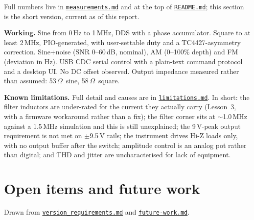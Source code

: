 \documentclass[11pt,a4paper]{article}
\newcommand{\ohm}{\ensuremath{\Omega}}
\newcommand{\doc}[1]{\href{https://github.com/Lambros25/Function-Generator/blob/main/docs/#1}{\texttt{#1}}}
\newcommand{\docu}[2]{\href{https://github.com/Lambros25/Function-Generator/blob/main/docs/#1}{\texttt{#2}}}
\newcommand{\repofile}[1]{\href{https://github.com/Lambros25/Function-Generator/blob/main/#1}{\texttt{#1}}}
\begin{document}
Full numbers live in \doc{measurements.md} and at the top of \repofile{README.md}; this
section is the short version, current as of this report.

\textbf{Working.} Sine from 0\,Hz to 1\,MHz, DDS with a phase accumulator. Square to at
least 2\,MHz, PIO-generated, with user-settable duty and a TC4427-asymmetry correction.
Sine+noise (SNR 0--60\,dB, nominal), AM (0--100\% depth) and FM (deviation in Hz). USB CDC
serial control with a plain-text command protocol and a desktop UI. No DC offset observed.
Output impedance measured rather than assumed: 53\,\ohm\ sine, 58\,\ohm\ square.

\textbf{Known limitations.} Full detail and causes are in \doc{limitations.md}. In short:
the filter inductors are under-rated for the current they actually carry (Lesson~3, with a
firmware workaround rather than a fix); the filter corner sits at $\sim$1.0\,MHz against a
1.5\,MHz simulation and this is still unexplained; the 9\,V-peak output requirement is not
met on $\pm$9.5\,V rails; the instrument drives Hi-Z loads only, with no output buffer
after the switch; amplitude control is an analog pot rather than digital; and THD and
jitter are uncharacterised for lack of equipment.

\section{Open items and future work}
\label{sec:open}

Drawn from \docu{version_requirements.md}{version\_requirements.md} and
\doc{future-work.md}.
\end{document}
